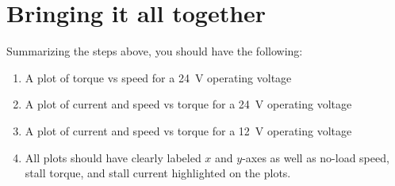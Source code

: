 \documentclass{exam}
\begin{document}
    
    

\section{Bringing it all together}
Summarizing the steps above, you should have the following:
\begin{enumerate}
\item A plot of torque vs speed for a \SI{24}{\volt} operating voltage
\item A plot of current and speed vs torque for a \SI{24}{\volt} operating voltage
\item A plot of current and speed vs torque for a \SI{12}{\volt} operating voltage
\item All plots should have clearly labeled $x$ and $y$-axes as well as no-load speed, stall torque, and stall current highlighted on the plots.
\end{enumerate}
\end{document}
